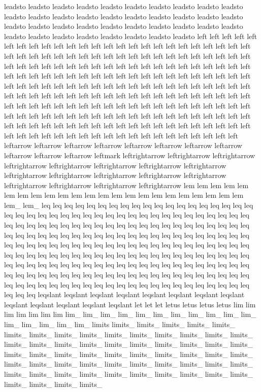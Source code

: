 leadsto leadsto leadsto leadsto leadsto leadsto leadsto leadsto leadsto leadsto leadsto leadsto leadsto leadsto leadsto leadsto leadsto leadsto leadsto leadsto leadsto leadsto leadsto leadsto leadsto leadsto leadsto leadsto leadsto leadsto leadsto leadsto leadsto leadsto leadsto leadsto leadsto leadsto left left left left left left left left left left left left left left left left left left left left left left left left left left left left left left left left left left left left left left left left left left left left left left left left left left left left left left left left left left left left left left left left left left left left left left left left left left left left left left left left left left left left left left left left left left left left left left left left left left left left left left left left left left left left left left left left left left left left left left left left left left left left left left left left left left left left left left left left left left left left left left left left left left left left left left left left left left left left left left left left left left left left left left left left left left left left left left left left left left left left left left left left left left left left left left left left left left left left left left left left left left left left leftarrow leftarrow leftarrow leftarrow leftarrow leftarrow leftarrow leftarrow leftarrow leftarrow leftarrow leftmark leftrightarrow leftrightarrow leftrightarrow leftrightarrow leftrightarrow leftrightarrow leftrightarrow leftrightarrow leftrightarrow leftrightarrow leftrightarrow leftrightarrow leftrightarrow leftrightarrow leftrightarrow leftrightarrow leftrightarrow lem lem lem lem lem lem lem lem lem lem lem lem lem lem lem lem lem lem lem lem lem lem lem lem_ lem_ leq leq leq leq leq leq leq leq leq leq leq leq leq leq leq leq leq leq leq leq leq leq leq leq leq leq leq leq leq leq leq leq leq leq leq leq leq leq leq leq leq leq leq leq leq leq leq leq leq leq leq leq leq leq leq leq leq leq leq leq leq leq leq leq leq leq leq leq leq leq leq leq leq leq leq leq leq leq leq leq leq leq leq leq leq leq leq leq leq leq leq leq leq leq leq leq leq leq leq leq leq leq leq leq leq leq leq leq leq leq leq leq leq leq leq leq leq leq leq leq leq leq leq leq leq leq leq leq leq leq leq leq leq leq leq leq leq leq leq leq leq leq leq leq leq leq leq leq leq leq leq leq leq leq leq leq leq leq leq leq leq leq leq leq leq leq leq leq leq leq leq leq leq leq leq leq leq leq leq leq leq leq leq leq leq leq leq leq leq leq leq leq leq leq leq leq leq leq leqslant leqslant leqslant leqslant leqslant leqslant leqslant leqslant leqslant leqslant leqslant leqslant leqslant let let let letus letus letus letus lim lim lim lim lim lim lim lim_ lim_ lim_ lim_ lim_ lim_ lim_ lim_ lim_ lim_ lim_ lim_ lim_ lim_ lim_ lim_ limits limits_ limits_ limits_ limits_ limits_ limits_ limits_ limits_ limits_ limits_ limits_ limits_ limits_ limits_ limits_ limits_ limits_ limits_ limits_ limits_ limits_ limits_ limits_ limits_ limits_ limits_ limits_ limits_ limits_ limits_ limits_ limits_ limits_ limits_ limits_ limits_ limits_ limits_ limits_ limits_ limits_ limits_ limits_ limits_ limits_ limits_ limits_ limits_ limits_ limits_ limits_ limits_ limits_ limits_ limits_ limits_ limits_ limits_ limits_ 